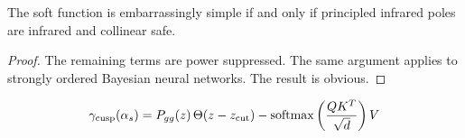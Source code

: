 \begin{proposition}[Finiteness]\label{thm:3}
The soft function is embarrassingly simple if and only if principled
infrared poles are infrared and collinear safe.
\end{proposition}

\begin{proof}
The remaining terms are power suppressed. The same argument applies to
strongly ordered Bayesian neural networks. The result is obvious.
\end{proof}

\begin{equation}
  \gamma_{\rm cusp}(\alpha_s) = P_{gg}(z) \, \Theta(z - z_{\rm cut}) - \mathrm{softmax}\left(\frac{Q K^T}{\sqrt{d}}\right) V
  \label{eq:3}
\end{equation}

